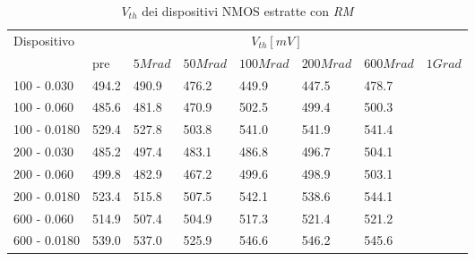 \documentclass[12pt, letterpaper]{book}
\begin{document}
\begin{table}[H]
  \renewcommand{\arraystretch}{1.3}
  \begin{tabular}{m{2.1cm} m{0.8cm} m{1.1cm} m{1.3cm} m{1.5cm} m{1.5cm} m{1.5cm} m{1cm}}
    \toprule
    \multirow{2}{*}{Dispositivo} & \multicolumn{7}{c}{$V_{th} [mV] $}                                                                    \\
    \cmidrule{2-8}
                                 & pre                                & $5Mrad$ & $50Mrad$ & $100Mrad$ & $200Mrad$ & $600Mrad$ & $1Grad$ \\
    \midrule
    100 - 0.030                     & 494.2                              & 490.9   & 476.2    & 449.9     & 447.5     & 478.7     &         \\
    \hline
    100 - 0.060                     & 485.6                              & 481.8   & 470.9    & 502.5     & 499.4     & 500.3     &         \\
    \hline
    100 - 0.0180                    & 529.4                              & 527.8   & 503.8    & 541.0     & 541.9     & 541.4     &         \\
    \hline
    200 - 0.030                     & 485.2                              & 497.4   & 483.1    & 486.8     & 496.7     & 504.1     &         \\
    \hline
    200 - 0.060                     & 499.8                              & 482.9   & 467.2    & 499.6     & 498.9     & 503.1     &         \\
    \hline
    200 - 0.0180                    & 523.4                              & 515.8   & 507.5    & 542.1     & 538.6     & 544.1     &         \\
    \hline
    600 - 0.060                     & 514.9                              & 507.4   & 504.9    & 517.3     & 521.4     & 521.2     &         \\
    \hline
    600 - 0.0180                    & 539.0                              & 537.0   & 525.9    & 546.6     & 546.2     & 545.6     &         \\
    \bottomrule
  \end{tabular}
  \caption{$V_{th}$ dei dispositivi NMOS estratte con \emph{RM}}
  \label{tab:VthRMN}
\end{table}
\end{document}
